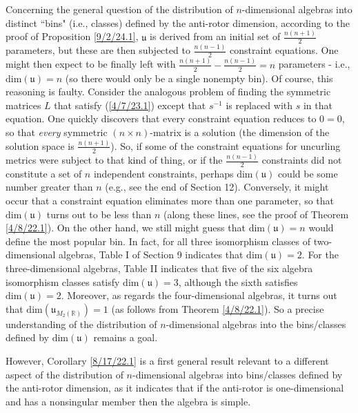\documentclass{amsart}
\numberwithin{equation}{section}
\theoremstyle{definition}
\numberwithin{theorem}{section}
\begin{document}
Concerning the general question of the distribution of $n$-dimensional algebras into distinct ``bins" (i.e., classes) defined by the anti-rotor dimension, according to the proof of Proposition \ref{9/2/24.1}, $\mathfrak{u}$ is derived from an initial set of $\frac{n(n+1)}{2}$ parameters, but these are then subjected to  $\frac{n(n-1)}{2}$ constraint equations.  One might then expect to be finally left with $\frac{n(n+1)}{2} - \frac{n(n-1)}{2} = n$ parameters - i.e., $\text{dim}(\mathfrak{u}) = n$ (so there would only be a single nonempty bin).  Of course, this reasoning is faulty.  Consider the analogous problem of finding the symmetric matrices $L$ that satisfy (\ref{4/7/23.1}) except that $s^{-1}$ is replaced with $s$ in that equation.  One quickly discovers that every constraint equation reduces to $0=0$, so that {\it every} symmetric $(n\times n)$-matrix is a solution (the dimension of the solution space is $\frac{n(n+1)}{2}$).  So, if some of the constraint equations for uncurling metrics were subject to  that kind of thing, or if the $\frac{n(n-1)}{2}$ constraints did not constitute a set of $n$ independent constraints, perhaps $\text{dim}(\mathfrak{u})$ could be some number greater than $n$ (e.g., see the end of Section 12).  Conversely, it might occur that a constraint equation eliminates more than one parameter, so that $\text{dim}(\mathfrak{u})$ turns out to be less than $n$ (along these lines, see the proof of Theorem \ref{4/8/22.1}).  On the other hand, we still might guess that $\text{dim}(\mathfrak{u}) = n$ would define the most popular bin.  In fact, for all three isomorphism classes of two-dimensional algebras, Table I of Section 9 indicates that \mbox{$\text{dim}(\mathfrak{u}) = 2$}.  For the three-dimensional algebras, Table II indicates that five of the six algebra isomorphism classes satisfy $\text{dim}(\mathfrak{u}) = 3$, although the sixth satisfies $\text{dim}(\mathfrak{u}) = 2$.  Moreover, as regards the four-dimensional algebras, it turns out that $\text{dim}(\mathfrak{u}_{M_2(\mathbb{R})}) = 1$ (as follows from Theorem \ref{4/8/22.1}). So a precise understanding of the distribution of $n$-dimensional algebras into the bins/classes defined by $\text{dim}(\mathfrak{u})$ remains a goal.  

However, Corollary \ref{8/17/22.1} is a first general result relevant to a different aspect of the distribution of $n$-dimensional algebras into bins/classes defined by the anti-rotor dimension, as it indicates that if the anti-rotor is one-dimensional and has a nonsingular member then the algebra is simple.  
\end{document}
